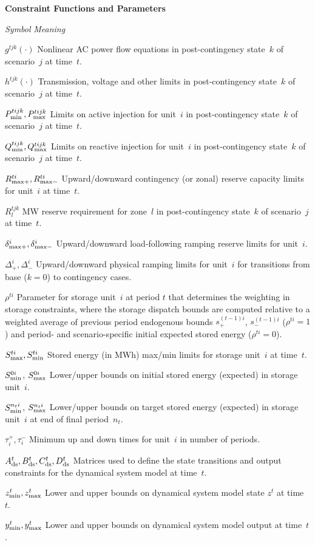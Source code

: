 \documentclass[12pt]{article}
\newcommand{\namelistlabel}[1]{\mbox{#1}\hfil}
\newenvironment{namelist}[1]{%
\begin{list}{}
  {
    \let\makelabel\namelistlabel
    \settowidth{\labelwidth}{#1}
    \setlength{\leftmargin}{1.1\labelwidth}
  }
 }{%
\end{list}}
\numberwithin{equation}{section}
\numberwithin{table}{section}
\numberwithin{figure}{section}
\begin{document}
\begin{namelist}{XXXXXXXXXX}
\item[]
\item[{\bf Constraint Functions and Parameters}]
\item[\emph{Symbol}] \emph{Meaning}
\item[$g^{tjk}(\cdot)$] Nonlinear AC power flow equations in post-contingency state~$k$ of scenario~$j$ at time~$t$.
\item[$h^{tjk}(\cdot)$] Transmission, voltage and other limits in post-contingency state~$k$ of scenario~$j$ at time~$t$.
\item[$P_{\rm min}^{tijk}, P_{\rm max}^{tijk}$] Limits on active injection for unit~$i$ in post-contingency state~$k$ of scenario~$j$ at time~$t$.
\item[$Q_{\rm min}^{tijk}, Q_{\rm max}^{tijk}$] Limits on reactive injection for unit~$i$ in post-contingency state~$k$ of scenario~$j$ at time~$t$.
\item[$R_{\rm max+}^{ti}, R_{\rm max-}^{ti}$] Upward/downward contingency (or zonal) reserve capacity limits for unit~$i$ at time~$t$.
\item[$R_l^{tjk}$] MW reserve requirement for zone~$l$ in post-contingency state~$k$ of scenario~$j$ at time~$t$.
\item[$\delta^{i}_{\rm max+}, \delta^i_{\rm max-}$] Upward/downward load-following ramping reserve limits for unit~$i$.
\item[$\Delta_+^i, \Delta_-^i$] Upward/downward physical ramping limits for unit~$i$ for transitions from base ($k=0$) to contingency cases.
\item[$\rho^{ti}$] Parameter for storage unit~$i$ at period $t$ that determines the weighting in storage constraints, where the storage dispatch bounds are computed relative to a weighted average of previous period endogenous bounds $s_+^{(t-1)i}$, $s_-^{(t-1)i}$ ($\rho^{ti} = 1$) and period- and scenario-specific initial expected stored energy ($\rho^{ti} = 0$).
\item[$S^{ti}_{\rm max},S^{ti}_{\rm min}$] Stored energy (in MWh) max/min limits for storage unit~$i$ at time~$t$.
\item[$S_{\rm min}^{0i}$, $S_{\rm max}^{0i}$] Lower/upper bounds on initial stored energy (expected) in storage unit~$i$.
\item[$S_{\rm min}^{n_ti}$, $S_{\rm max}^{n_ti}$] Lower/upper bounds on target stored energy (expected) in storage unit~$i$ at end of final period~$n_t$.
\item[$\tau_i^+, \tau_i^-$] Minimum up and down times for unit~$i$ in number of periods.
\item[$A_{\rm ds}^t, B_{\rm ds}^t, C_{\rm ds}^t, D_{\rm ds}^t$] Matrices used to define the state transitions and output constraints for the dynamical system model at time~$t$.
\item[$z_{\rm min}^t, z_{\rm max}^t$] Lower and upper bounds on dynamical system model state $z^t$ at time~$t$.
\item[$y_{\rm min}^t, y_{\rm max}^t$] Lower and upper bounds on dynamical system model output at time~$t$.


\end{namelist}
\end{document}
